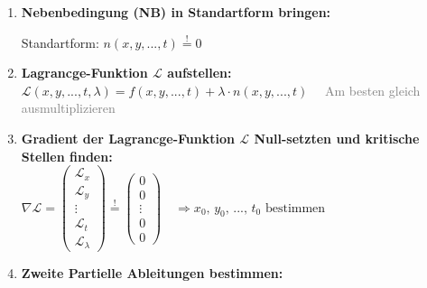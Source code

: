 \begin{enumerate}[itemsep=1ex]
    \item \textbf{Nebenbedingung (NB) in Standartform bringen:}\\
    \begin{minipage}[t]{0.4\columnwidth}
        Standartform: $n(x, y, ... , t) \stackrel{!}{=} 0$
    \end{minipage}\hfill
    \begin{minipage}[t]{0.6\columnwidth}
    \end{minipage}


    \item \textbf{Lagrancge-Funktion $\mathcal{L}$ aufstellen:}\\
    $\mathcal{L}(x, y, ..., t, \lambda) =
    f(x, y, ..., t) + \lambda \cdot n(x, y, ..., t) \,\,\,\,\,\,$ \textcolor{gray}{Am besten gleich ausmultiplizieren}
    

    \item \textbf{Gradient der Lagrancge-Funktion $\mathcal{L}$ Null-setzten und kritische Stellen finden:}\\
    $\nabla \mathcal{L}=
    \begin{pmatrix}
        \mathcal{L}_x\\
        \mathcal{L}_y\\
        \vdots \\
        \mathcal{L}_t\\
        \mathcal{L}_\lambda
    \end{pmatrix} \stackrel{!}{=}
    \begin{pmatrix}
        0\\
        0\\
        \vdots \\
        0\\
        0
    \end{pmatrix}
    \, \, \, \, \, \,
    \Rightarrow 
    x_0 \text{, } y_0 \text{, }... \text{, } t_0 \text{ bestimmen}$\\

    \item \textbf{Zweite Partielle Ableitungen bestimmen:}\\
    


\end{enumerate}
